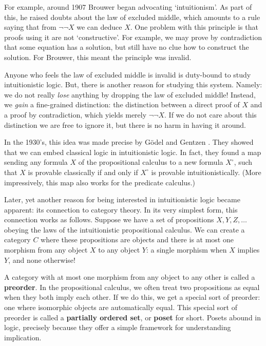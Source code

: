\documentclass[12pt]{article}
\begin{document}
For example, around 1907 Brouwer \cite{Heyting} began advocating
`intuitionism'.  As part of this, he raised doubts about the law 
of excluded middle, which amounts to a rule saying that from $\neg \neg X$ 
we can deduce $X$.  One problem with this principle is that proofs 
using it are not `constructive'.   For example, we may 
prove by contradiction that some equation has a solution, but 
still have no clue how to construct the solution.   For Brouwer, this
meant the principle was invalid.

Anyone who feels the law of excluded middle is invalid is 
duty-bound to study intuitionistic logic.  But, there is 
another reason for studying this system.  Namely: we do not 
really {\it lose} anything by dropping the law
of excluded middle!  Instead, we {\em gain} a 
fine-grained distinction: the distinction between a direct proof 
of $X$ and a proof by contradiction, which yields merely $\neg \neg X$. 
If we do not care about this distinction we are free to ignore it,
but there is no harm in having it around.  

In the 1930's, this idea was made precise by G\"odel \cite{Goedel} and
Gentzen \cite{Gentzen}.  They showed that we can embed classical logic
in intuitionistic logic.  In fact, they found a map sending any
formula $X$ of the propositional calculus to a new formula $X^\circ$,
such that $X$ is provable classically if and only if $X^\circ$ is
provable intuitionistically.  (More impressively, this map also works
for the predicate calculus.)

Later, yet another reason for being interested in intuitionistic logic
became apparent: its connection to category theory.  In its 
very simplest form, this connection works as follows.  Suppose we 
have a set of propositions $X, Y, Z, \dots$ obeying the laws of
the intuitionistic propositional calculus.  We can create a category
$C$ where these propositions are objects and there is at most one morphism
from any object $X$ to any object $Y$: a single morphism when $X$ implies $Y$, 
and none otherwise!  

A category with at most one morphism from any object to any other 
is called a {\bf preorder}.  In the propositional calculus, we often
treat two propositions as equal when they both imply each other.
If we do this, we get a special sort of preorder: one where
isomorphic objects are automatically equal.  This special sort of
preorder is called a {\bf partially ordered set}, or {\bf poset}
for short.  Posets abound in logic, precisely because they offer
a simple framework for understanding implication.  
\end{document}
